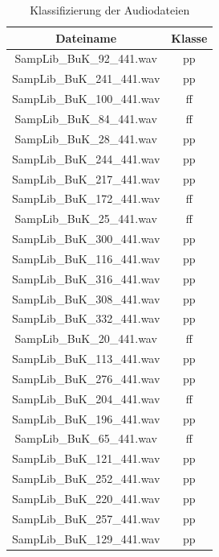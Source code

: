 \begin{table}[H]
\centering
\caption{Klassifizierung der Audiodateien}
\label{tab:T}

\hfill
\begin{minipage}[b]{0.4\textwidth}
  \begin{tabular}{ | c | c | }
    \hline
    Dateiname & Klasse \\
    \hline
    SampLib\_BuK\_92\_441.wav & pp \\
    \hline
    SampLib\_BuK\_241\_441.wav & pp \\
    \hline
    SampLib\_BuK\_100\_441.wav & ff \\
    \hline
    SampLib\_BuK\_84\_441.wav & ff \\
    \hline
    SampLib\_BuK\_28\_441.wav & pp \\
    \hline
    SampLib\_BuK\_244\_441.wav & pp \\
    \hline
    SampLib\_BuK\_217\_441.wav & pp \\
    \hline
    SampLib\_BuK\_172\_441.wav & ff \\
    \hline
    SampLib\_BuK\_25\_441.wav & ff \\
    \hline
    SampLib\_BuK\_300\_441.wav & pp \\
    \hline
    SampLib\_BuK\_116\_441.wav & pp \\
    \hline
    SampLib\_BuK\_316\_441.wav & pp \\
    \hline
    SampLib\_BuK\_308\_441.wav & pp \\
    \hline
    SampLib\_BuK\_332\_441.wav & pp \\
    \hline
    SampLib\_BuK\_20\_441.wav & ff \\
    \hline
    SampLib\_BuK\_113\_441.wav & pp \\
    \hline
    SampLib\_BuK\_276\_441.wav & pp \\
    \hline
    SampLib\_BuK\_204\_441.wav & ff \\
    \hline
    SampLib\_BuK\_196\_441.wav & pp \\
    \hline
    SampLib\_BuK\_65\_441.wav & ff \\
    \hline
    SampLib\_BuK\_121\_441.wav & pp \\
    \hline
    SampLib\_BuK\_252\_441.wav & pp \\
    \hline
    SampLib\_BuK\_220\_441.wav & pp \\
    \hline
    SampLib\_BuK\_257\_441.wav & pp \\
    \hline
    SampLib\_BuK\_129\_441.wav & pp \\

\end{tabular}
\end{minipage}
\end{table}

